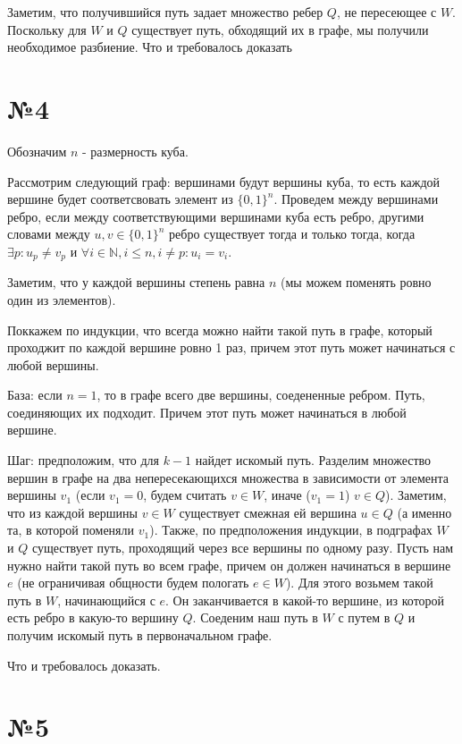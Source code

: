 \documentclass[12pt]{article}
\begin{document}
	Заметим, что получившийся путь задает множество ребер $Q$, 
	не пересеющее с $W$. Поскольку для $W$ и $Q$ существует путь, обходящий
	их в графе, мы получили необходимое разбиение. Что и требовалось доказать

	\section*{№4}
	Обозначим $n$ - размерность куба.
	
	Рассмотрим следующий граф: вершинами будут вершины куба, 
	то есть каждой вершине будет соответсвовать элемент из $\{0, 1\}^n$.
	Проведем между вершинами ребро, если между соответствующими вершинами 
	куба есть ребро, другими словами между $u, v \in \{0, 1\}^n$ ребро
	существует тогда и только тогда, когда 
	$ \exists	p: u_p \neq v_p$ и $\forall i \in \mathbb{N}, i \leqslant n,
	i \neq p : u_i=v_i$.
	
	Заметим, что у каждой вершины степень равна $n$ 
	(мы можем поменять ровно один из элементов).
	
	Поккажем по индукции, что всегда можно найти такой путь в графе, 
	который проходжит по каждой вершине ровно 1 раз, 
	причем этот путь может начинаться с любой вершины.
	
	База: если $n = 1$, то в графе всего две вершины, соедененные ребром.
	Путь, соединяющих их подходит. 
	Причем этот путь может начинаться в любой вершине.
	
	Шаг: предположим, что для $k - 1$ найдет искомый путь. 
	Разделим множество вершин в графе на два непересекающихся множества
	в зависимости от элемента вершины $v_1$ 
	(если $v_1 = 0$, будем считать $v \in W$, иначе ($v_1=1$) $v \in Q$).
	Заметим, что из каждой вершины $v \in W$ существует смежная ей вершина $u \in Q$ (а именно та, в которой поменяли $v_1$). 
	Также, по предположения индукции, в подграфах $W$ и $Q$ существует 
	путь, проходящий через все вершины по одному разу. 
	Пусть нам нужно найти такой путь во всем графе, 
	причем он должен начинаться в вершине $e$ 
	(не ограничивая общности будем пологать $e \in W$).
	Для этого возьмем такой путь в $W$, начинающийся с $e$.
	Он заканчивается в какой-то вершине, из которой есть ребро в 
	какую-то вершину $Q$. Соеденим наш путь в $W$ с путем в $Q$ и получим искомый путь в первоначальном графе.
	
	Что и требовалось доказать.
	
	\section*{№5}
	 
\end{document}
